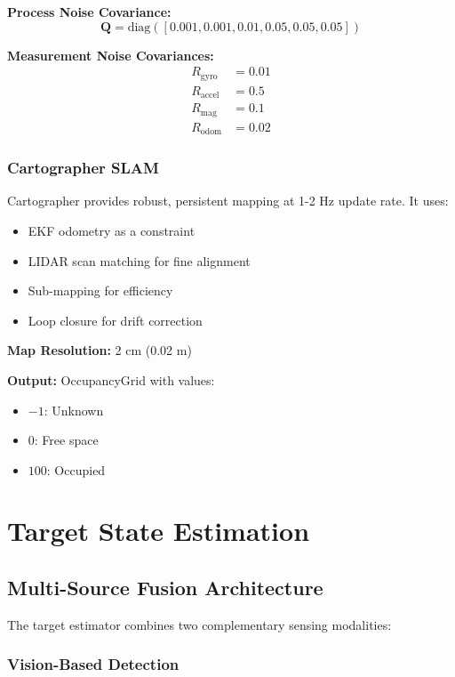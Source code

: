 \documentclass[11pt]{article}
\begin{document}
\textbf{Process Noise Covariance:}
\[
\mathbf{Q} = \text{diag}([0.001, 0.001, 0.01, 0.05, 0.05, 0.05])
\]

\textbf{Measurement Noise Covariances:}
\begin{align}
R_{\text{gyro}} &= 0.01 \\
R_{\text{accel}} &= 0.5 \\
R_{\text{mag}} &= 0.1 \\
R_{\text{odom}} &= 0.02
\end{align}

\subsubsection{Cartographer SLAM}

Cartographer provides robust, persistent mapping at 1-2 Hz update rate. It uses:
\begin{itemize}
    \item EKF odometry as a constraint
    \item LIDAR scan matching for fine alignment
    \item Sub-mapping for efficiency
    \item Loop closure for drift correction
\end{itemize}

\textbf{Map Resolution:} 2 cm (0.02 m)

\textbf{Output:} OccupancyGrid with values:
\begin{itemize}
    \item $-1$: Unknown
    \item $0$: Free space
    \item $100$: Occupied
\end{itemize}

\section{Target State Estimation}

\subsection{Multi-Source Fusion Architecture}

The target estimator combines two complementary sensing modalities:

\subsubsection{Vision-Based Detection}
\end{document}
